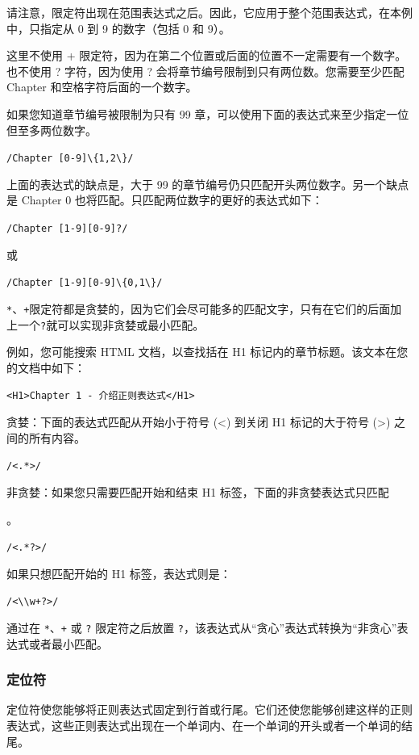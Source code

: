 \documentclass[doctor,openright,twoside]{sjtuthesis}
\newcommand{\passthrough}[1]{#1}
\theoremstyle{plain}
\theoremstyle{definition}
\theoremstyle{remark}
\theoremstyle{ocrenumbox}
\theoremstyle{plain}
\begin{document}
请注意，限定符出现在范围表达式之后。因此，它应用于整个范围表达式，在本例中，只指定从
0 到 9 的数字（包括 0 和 9）。

这里不使用 +
限定符，因为在第二个位置或后面的位置不一定需要有一个数字。也不使用 ?
字符，因为使用 ? 会将章节编号限制到只有两位数。您需要至少匹配 Chapter
和空格字符后面的一个数字。

如果您知道章节编号被限制为只有 99
章，可以使用下面的表达式来至少指定一位但至多两位数字。

\passthrough{\lstinline!/Chapter [0-9]\{1,2\}/!}

上面的表达式的缺点是，大于 99
的章节编号仍只匹配开头两位数字。另一个缺点是 Chapter 0
也将匹配。只匹配两位数字的更好的表达式如下：

\passthrough{\lstinline!/Chapter [1-9][0-9]?/!}

或

\passthrough{\lstinline!/Chapter [1-9][0-9]\{0,1\}/!}

\passthrough{\lstinline!*!}、\passthrough{\lstinline!+!}限定符都是贪婪的，因为它们会尽可能多的匹配文字，只有在它们的后面加上一个\passthrough{\lstinline!?!}就可以实现非贪婪或最小匹配。

例如，您可能搜索 HTML 文档，以查找括在 H1
标记内的章节标题。该文本在您的文档中如下：

\passthrough{\lstinline!<H1>Chapter 1 - 介绍正则表达式</H1>!}

贪婪：下面的表达式匹配从开始小于符号 (\textless{}) 到关闭 H1
标记的大于符号 (\textgreater{}) 之间的所有内容。

\passthrough{\lstinline!/<.*>/!}

非贪婪：如果您只需要匹配开始和结束 H1 标签，下面的非贪婪表达式只匹配

。

\passthrough{\lstinline!/<.*?>/!}

如果只想匹配开始的 H1 标签，表达式则是：

\passthrough{\lstinline!/<\\w+?>/!}

通过在 \passthrough{\lstinline!*!}、\passthrough{\lstinline!+!} 或
\passthrough{\lstinline!?!} 限定符之后放置
\passthrough{\lstinline!?!}，该表达式从``贪心''表达式转换为``非贪心''表达式或者最小匹配。

\subsubsection{定位符}

定位符使您能够将正则表达式固定到行首或行尾。它们还使您能够创建这样的正则表达式，这些正则表达式出现在一个单词内、在一个单词的开头或者一个单词的结尾。
\end{document}
